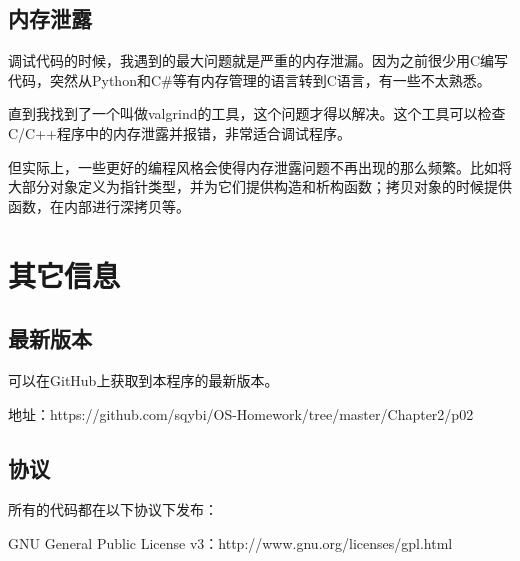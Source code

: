 \documentclass{article}
\begin{document}
\subsection{内存泄露}
调试代码的时候，我遇到的最大问题就是严重的内存泄漏。因为之前很少用C编写代码，突然从Python和C\#等有内存管理的语言转到C语言，有一些不太熟悉。

直到我找到了一个叫做valgrind的工具，这个问题才得以解决。这个工具可以检查C/C++程序中的内存泄露并报错，非常适合调试程序。

但实际上，一些更好的编程风格会使得内存泄露问题不再出现的那么频繁。比如将大部分对象定义为指针类型，并为它们提供构造和析构函数；拷贝对象的时候提供函数，在内部进行深拷贝等。

\section{其它信息}

\subsection{最新版本}
可以在GitHub上获取到本程序的最新版本。

地址：https://github.com/sqybi/OS-Homework/tree/master/Chapter2/p02

\subsection{协议}
所有的代码都在以下协议下发布：

GNU General Public License v3：http://www.gnu.org/licenses/gpl.html
\end{document}
